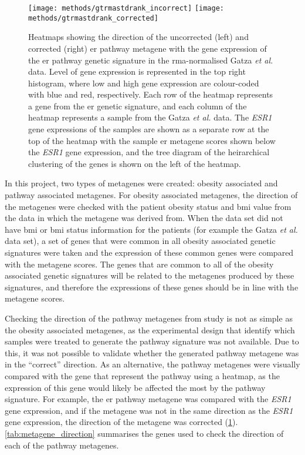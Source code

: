 \begin{figure}[htpb]
	\centering
	\texttt{[image: methods/gtrmastdrank\_incorrect]}
	\hfill
	\texttt{[image: methods/gtrmastdrank\_corrected]}
	\caption[Example heatmaps showing the direction of the uncorrected and corrected \acrshort{er} pathway metagene with the gene expression of the \acrshort{er} pathway genetic signature in the \acrshort{rma}-normalised Gatza \textit{et al.} data.]{Heatmaps showing the direction of the uncorrected (left) and corrected (right) \gls{er} pathway metagene with the gene expression of the \gls{er} pathway genetic signature in the \gls{rma}-normalised Gatza \textit{et al.} data.
	Level of gene expression is represented in the top right histogram, where low and high gene expression are colour-coded with blue and red, respectively.
	Each row of the heatmap represents a gene from the \gls{er} genetic signature, and each column of the heatmap represents a sample from the Gatza \textit{et al.} data.
	The \textit{ESR1} gene expressions of the samples are shown as a separate row at the top of the heatmap with the sample \gls{er} metagene scores shown below the \textit{ESR1} gene expression, and the tree diagram of the heirarchical clustering of the genes is shown on the left of the heatmap.
	}
	\label{fig:methods/meta_dir}
\end{figure}

In this project, two types of metagenes were created: obesity associated and pathway associated metagenes.
For obesity associated metagenes, the direction of the metagenes were checked with the patient obesity status and \gls{bmi} value from the data in which the metagene was derived from.
When the data set did not have \gls{bmi} or \gls{bmi} status information for the patients (for example the Gatza \textit{et al.} data set), a set of genes that were common in all obesity associated genetic signatures were taken and the expression of these common genes were compared with the metagene scores.
The genes that are common to all of the obesity associated genetic signatures will be related to the metagenes produced by these signatures, and therefore the expressions of these genes should be in line with the metagene scores.

Checking the direction of the pathway metagenes from \citet{Gatza2010a} study is not as simple as the obesity associated metagenes, as the experimental design that identify which samples were treated to generate the pathway signature was not available.
Due to this, it was not possible to validate whether the generated pathway metagene was in the ``correct'' direction.
As an alternative, the pathway metagenes were visually compared with the gene that represent the pathway using a heatmap, as the expression of this gene would likely be affected the most by the pathway signature.
For example, the \gls{er} pathway metagene was compared with the \textit{ESR1} gene expression, and if the metagene was not in the same direction as the \textit{ESR1} gene expression, the direction of the metagene was corrected (\cref{fig:methods/meta_dir}).
\cref{tab:metagene_direction} summarises the genes used to check the direction of each of the pathway metagenes.

